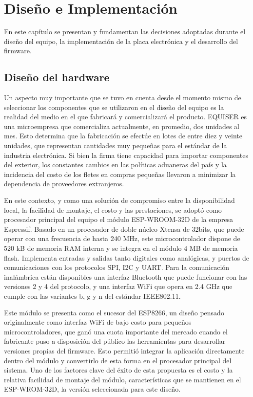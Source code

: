 \chapter{Diseño e Implementación} %
\label{Chapter3} 

En este capítulo se presentan y fundamentan las decisiones adoptadas durante el diseño del equipo, la implementación de la placa electrónica y el desarrollo del firmware.

\section{Diseño del hardware}
\label{sec:hardware}

Un aspecto muy importante que se tuvo en cuenta desde el momento mismo de seleccionar los componentes que se utilizaron en el diseño del equipo es la realidad del medio en el que fabricará y comercializará el producto. EQUISER es una microempresa que comercializa actualmente, en promedio, dos unidades al mes. Esto determina que la fabricación se efectúe en lotes de entre diez y veinte unidades, que representan cantidades muy pequeñas para el estándar de la industria electrónica. Si bien la firma tiene capacidad para importar componentes del exterior, los constantes cambios en las políticas aduaneras del país y la incidencia del costo de los fletes en compras pequeñas llevaron a  minimizar la dependencia de proveedores extranjeros.

En este contexto, y como una solución de compromiso entre la disponibilidad local, la facilidad de montaje, el costo y las prestaciones, se adoptó como procesador principal del equipo el módulo ESP-WROOM-32D\cite{ESP32WROOM} de la empresa Espressif. Basado en un procesador de doble núcleo Xtensa de 32bits, que puede operar con una frecuencia de hasta 240 MHz, este microcontrolador dispone de 520 kB de memoria RAM interna y se integra en el módulo 4 MB de memoria flash. Implementa entradas y salidas tanto digitales como analógicas, y puertos de comunicaciones con los protocolos SPI, I2C y UART. Para la comunicación inalámbrica están disponibles una interfaz Bluetooth que puede funcionar con las versiones 2 y 4 del protocolo, y una interfaz WiFi que opera en 2.4 GHz que cumple con las variantes b, g y n del estándar IEEE802.11.

Este módulo se presenta como el sucesor del ESP8266, un diseño pensado originalmente como interfaz WiFi de bajo costo para pequeños microcontroladores, que ganó una cuota importante del mercado cuando el fabricante puso a disposición del público las herramientas para desarrollar versiones propias del firmware. Esto permitió integrar la aplicación directamente dentro del módulo y convertirlo de esta forma en el procesador principal del sistema. Uno de los factores clave del éxito de esta propuesta es el costo y la relativa facilidad de montaje del módulo, características que se mantienen en el ESP-WROM-32D, la versión seleccionada para este diseño. 

